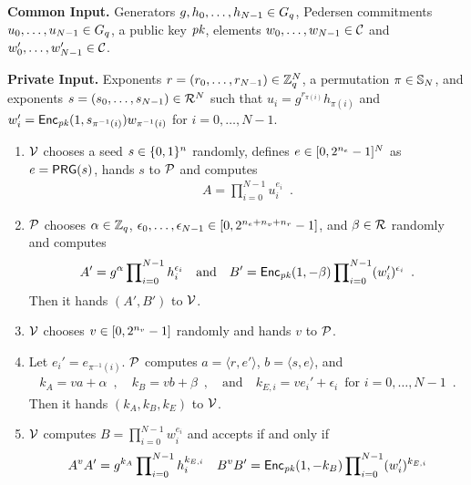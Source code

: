 \begin{nicebox}
  \begin{protocol}$\quad$\label{prot:ccpos}\\
    \textbf{Common Input.} Generators $g,h_0,\ldots,h_{N-1}\in\Gq$,
    Pedersen commitments $u_0,\ldots,u_{N-1}\in\Gq$, a public key
    $\pk$, elements $w_0,\ldots,w_{N-1}\in\CSpace$ and
    $w_0',\ldots,w_{N-1}'\in\CSpace$.

    \textbf{Private Input.} Exponents
    $r=(r_0,\ldots,r_{N-1})\in\zedq^N$, a permutation
    $\pi\in\permset{N}$, and exponents $s=(s_0,\ldots,s_{N-1})\in\RSpace^N$ such
    that $u_i=g^{r_{\pi(i)}}h_{\pi(i)}$ and
    $w_i'=\Enc_{\pk}(1,s_{\pi^{-1}(i)})w_{\pi^{-1}(i)}$ for $i=0,\ldots,N-1$.

  \begin{enumerate}

  \item $\V$ chooses a seed $s\in\{0,1\}^{\secp}$ randomly, defines
    $e\in\INT{\secpe}^N$ as $e=\PRG(s)$, hands $s$ to $\P$ and
    computes
    \begin{align*}
      A=\prod_{i=0}^{N-1}u_i^{e_i}\enspace.
    \end{align*}

  \item $\P$ chooses $\alpha\in\zedq$,
    $\epsilon_0,\ldots,\epsilon_{N-1}\in\INT{\secpe+\secpv+\secpr}$,
    and $\beta\in\RSpace$ randomly and computes
    \begin{align*}
      A'=g^{\alpha}\prod\nolimits_{i=0}^{N-1}h_i^{\epsilon_i}
      \quad\text{and}\quad B'=\Enc_{\pk}(1,-\beta)\prod\nolimits_{i=0}^{N-1}(w_i')^{\epsilon_i}\enspace.
    \end{align*}
    Then it hands $(A',B')$ to $\V$.

  \item $\V$ chooses $v\in\INT{\secpv}$ randomly and hands $v$ to $\P$.

  \item Let $e_i'=e_{\pi^{-1}(i)}$. $\P$ computes $a=\langle
    r,e'\rangle$, $b=\langle s,e\rangle$, and
    \begin{align*}
      k_A=va+\alpha\enspace,\quad
      k_{B}=vb+\beta \enspace,\quad\text{and}\quad
      k_{E,i}=ve_i'+\epsilon_i\enspace\text{for $i=0,\ldots,N-1$}\enspace.
    \end{align*}
    Then it hands $(k_A,k_B,k_E)$ to $\V$.

  \item $\V$ computes $B=\prod\nolimits_{i=0}^{N-1}w_i^{e_i}$
    and accepts if and only if
    \begin{align*}
      A^vA'&=g^{k_A}\prod\nolimits_{i=0}^{N-1}h_i^{k_{E,i}}
      &B^vB'&=\Enc_{\pk}(1,-k_{B})\prod\nolimits_{i=0}^{N-1}(w_i')^{k_{E,i}}\\
    \end{align*}

  \end{enumerate}
\end{protocol}
\end{nicebox}
